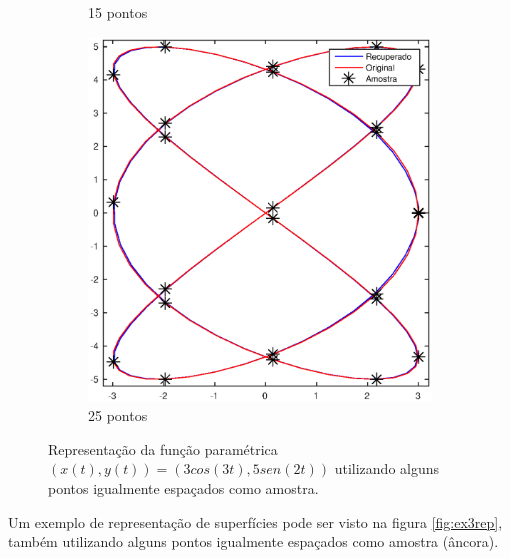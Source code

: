\begin{figure}[htb]
\begin{subfigure}[b]{0.43\textwidth}
		\caption{15 pontos}
		\label{fig:ex22}
	\end{subfigure}
	\hfill
	\begin{subfigure}[b]{0.43\textwidth}
		\centering
		\includegraphics[width=\textwidth]{imagens/cap4/rep_2_25.eps}
		\caption{25 pontos}
		\label{fig:ex23}
	\end{subfigure} %
	\caption{Representação da função paramétrica $(x(t), y(t)) = (3 cos(3t), 5sen(2t))$ utilizando alguns pontos igualmente espaçados como amostra.}
	\label{fig:ex2rep}
\end{figure}

Um exemplo de representação de superfícies pode ser visto na figura \ref{fig:ex3rep}, também utilizando alguns pontos igualmente espaçados como amostra (âncora).

